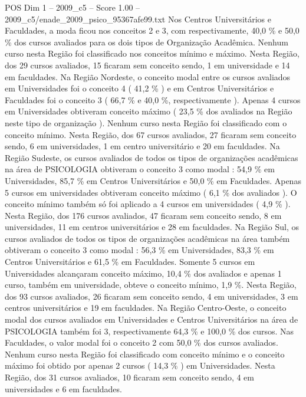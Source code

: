 \begin{textsample}{POS Dim 1 – 2009\_c5 – Score 1.00 – 2009\_c5/enade\_2009\_psico\_95367afe99.txt}
Nos Centros Universitários e Faculdades, a moda ficou nos conceitos 2 e 3, com respectivamente, 40,0 \% e 50,0 \% dos cursos avaliados para os dois tipos de Organização Acadêmica.
Nenhum curso nesta Região foi classificado nos conceitos mínimo e máximo.
Nesta Região, dos 29 cursos avaliados, 15 ficaram sem conceito sendo, 1 em universidade e 14 em faculdades.
Na Região Nordeste, o conceito modal entre os cursos avaliados em Universidades foi o conceito 4 ( 41,2 \% ) e em Centros Universitários e Faculdades foi o conceito 3 ( 66,7 \% e 40,0 \%, respectivamente ).
Apenas 4 cursos em Universidades obtiveram conceito máximo ( 23,5 \% dos avaliados na Região neste tipo de organização ).
Nenhum curso nesta Região foi classificado com o conceito mínimo.
Nesta Região, dos 67 cursos avaliados, 27 ficaram sem conceito sendo, 6 em universidades, 1 em centro universitário e 20 em faculdades.
Na Região Sudeste, os cursos avaliados de todos os tipos de organizações acadêmicas na área de PSICOLOGIA obtiveram o conceito 3 como modal : 54,9 \% em Universidades, 85,7 \% em Centros Universitários e 50,0 \% em Faculdades.
Apenas 5 cursos em universidades obtiveram conceito máximo ( 6,1 \% dos avaliados ).
O conceito mínimo também só foi aplicado a 4 cursos em universidades ( 4,9 \% ).
Nesta Região, dos 176 cursos avaliados, 47 ficaram sem conceito sendo, 8 em universidades, 11 em centros universitários e 28 em faculdades.
Na Região Sul, os cursos avaliados de todos os tipos de organizações acadêmicas na área também obtiveram o conceito 3 como modal : 56,3 \% em Universidades, 83,3 \% em Centros Universitários e 61,5 \% em Faculdades.
Somente 5 cursos em Universidades alcançaram conceito máximo, 10,4 \% dos avaliados e apenas 1 curso, também em universidade, obteve o conceito mínimo, 1,9 \%.
Nesta Região, dos 93 cursos avaliados, 26 ficaram sem conceito sendo, 4 em universidades, 3 em centros universitários e 19 em faculdades.
Na Região Centro-Oeste, o conceito modal dos cursos avaliados em Universidades e Centros Universitários na área de PSICOLOGIA também foi 3, respectivamente 64,3 \% e 100,0 \% dos cursos.
Nas Faculdades, o valor modal foi o conceito 2 com 50,0 \% dos cursos avaliados.
Nenhum curso nesta Região foi classificado com conceito mínimo e o conceito máximo foi obtido por apenas 2 cursos ( 14,3 \% ) em Universidades.
Nesta Região, dos 31 cursos avaliados, 10 ficaram sem conceito sendo, 4 em universidades e 6 em faculdades.

\end{textsample}
